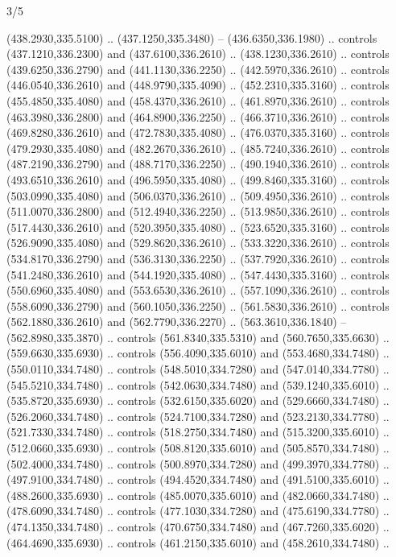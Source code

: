 \begin{flagdescription}{3/5}
\begin{scope}[xshift=0.5\flaglength,yshift=0.5\flagwidth,scale=\flagwidth/768]
\begin{scope}[y=0.80pt, x=0.80pt, yscale=-1.75, xscale=1.75,xshift=-74mm,yshift=-108mm]
\begin{scope}
\begin{scope}[shift={(-236.93803,83.83961)}]
\begin{scope}[shift={(0,-3.867)}]
  (438.2930,335.5100) .. (437.1250,335.3480) -- (436.6350,336.1980) .. controls
  (437.1210,336.2300) and (437.6100,336.2610) .. (438.1230,336.2610) .. controls
  (439.6250,336.2790) and (441.1130,336.2250) .. (442.5970,336.2610) .. controls
  (446.0540,336.2610) and (448.9790,335.4090) .. (452.2310,335.3160) .. controls
  (455.4850,335.4080) and (458.4370,336.2610) .. (461.8970,336.2610) .. controls
  (463.3980,336.2800) and (464.8900,336.2250) .. (466.3710,336.2610) .. controls
  (469.8280,336.2610) and (472.7830,335.4080) .. (476.0370,335.3160) .. controls
  (479.2930,335.4080) and (482.2670,336.2610) .. (485.7240,336.2610) .. controls
  (487.2190,336.2790) and (488.7170,336.2250) .. (490.1940,336.2610) .. controls
  (493.6510,336.2610) and (496.5950,335.4080) .. (499.8460,335.3160) .. controls
  (503.0990,335.4080) and (506.0370,336.2610) .. (509.4950,336.2610) .. controls
  (511.0070,336.2800) and (512.4940,336.2250) .. (513.9850,336.2610) .. controls
  (517.4430,336.2610) and (520.3950,335.4080) .. (523.6520,335.3160) .. controls
  (526.9090,335.4080) and (529.8620,336.2610) .. (533.3220,336.2610) .. controls
  (534.8170,336.2790) and (536.3130,336.2250) .. (537.7920,336.2610) .. controls
  (541.2480,336.2610) and (544.1920,335.4080) .. (547.4430,335.3160) .. controls
  (550.6960,335.4080) and (553.6530,336.2610) .. (557.1090,336.2610) .. controls
  (558.6090,336.2790) and (560.1050,336.2250) .. (561.5830,336.2610) .. controls
  (562.1880,336.2610) and (562.7790,336.2270) .. (563.3610,336.1840) --
  (562.8980,335.3870) .. controls (561.8340,335.5310) and (560.7650,335.6630) ..
  (559.6630,335.6930) .. controls (556.4090,335.6010) and (553.4680,334.7480) ..
  (550.0110,334.7480) .. controls (548.5010,334.7280) and (547.0140,334.7780) ..
  (545.5210,334.7480) .. controls (542.0630,334.7480) and (539.1240,335.6010) ..
  (535.8720,335.6930) .. controls (532.6150,335.6020) and (529.6660,334.7480) ..
  (526.2060,334.7480) .. controls (524.7100,334.7280) and (523.2130,334.7780) ..
  (521.7330,334.7480) .. controls (518.2750,334.7480) and (515.3200,335.6010) ..
  (512.0660,335.6930) .. controls (508.8120,335.6010) and (505.8570,334.7480) ..
  (502.4000,334.7480) .. controls (500.8970,334.7280) and (499.3970,334.7780) ..
  (497.9100,334.7480) .. controls (494.4520,334.7480) and (491.5100,335.6010) ..
  (488.2600,335.6930) .. controls (485.0070,335.6010) and (482.0660,334.7480) ..
  (478.6090,334.7480) .. controls (477.1030,334.7280) and (475.6190,334.7780) ..
  (474.1350,334.7480) .. controls (470.6750,334.7480) and (467.7260,335.6020) ..
  (464.4690,335.6930) .. controls (461.2150,335.6010) and (458.2610,334.7480) ..

\end{scope}
\end{scope}
\end{scope}
\end{scope}
\end{scope}
\end{flagdescription}
